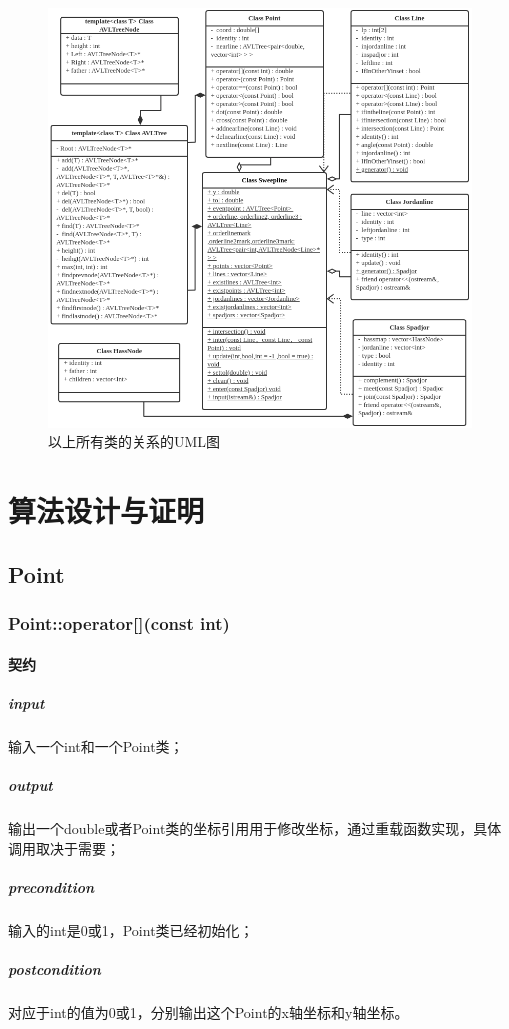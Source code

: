 \documentclass[a4paper]{book}
\numberwithin{equation}{chapter}
\theoremstyle{definition}
\begin{document}
\begin{figure}
	\centering
	\includegraphics[width=\textwidth]{UMLboolean.png}
    \caption{以上所有类的关系的UML图}
\end{figure}
%

\section{\heiti 算法设计与证明}

\subsection{Point}

\subsubsection{Point::operator[](const int)}
\paragraph{契约}
\subparagraph{input}
输入一个int和一个Point类；
\subparagraph{output}
输出一个double或者Point类的坐标引用用于修改坐标，通过重载函数实现，具体调用取决于需要；
\subparagraph{precondition}
输入的int是0或1，Point类已经初始化；
\subparagraph{postcondition}
对应于int的值为0或1，分别输出这个Point的x轴坐标和y轴坐标。
\end{document}

